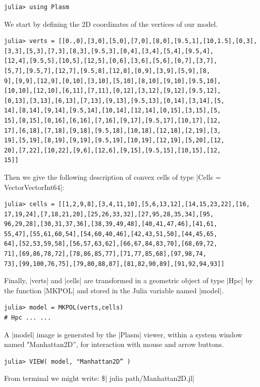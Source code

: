 \begin{script}
\begin{coding}
\begin{lstlisting}[language=JuliaLocal, style=julia, mathescape = true] 
julia> using Plasm
\end{lstlisting} 

We start by defining the 2D coordinates of the vertices of our model. 
\begin{lstlisting}[language=JuliaLocal, style=julia, mathescape = true] 
julia> verts = [[0.,0],[3,0],[5,0],[7,0],[8,0],[9.5,1],[10,1.5],[0,3],
[3,3],[5,3],[7,3],[8,3],[9.5,3],[0,4],[3,4],[5,4],[9.5,4],
[12,4],[9.5,5],[10,5],[12,5],[0,6],[3,6],[5,6],[0,7],[3,7],
[5,7],[9.5,7],[12,7],[9.5,8],[12,8],[0,9],[3,9],[5,9],[8,
9],[9,9],[12,9],[0,10],[3,10],[5,10],[8,10],[9,10],[9.5,10],
[10,10],[12,10],[6,11],[7,11],[0,12],[3,12],[9,12],[9.5,12],
[0,13],[3,13],[6,13],[7,13],[9,13],[9.5,13],[0,14],[3,14],[5,
14],[8,14],[9,14],[9.5,14],[10,14],[12,14],[0,15],[3,15],[5,
15],[8,15],[0,16],[6,16],[7,16],[9,17],[9.5,17],[10,17],[12,
17],[6,18],[7,18],[9,18],[9.5,18],[10,18],[12,18],[2,19],[3,
19],[5,19],[8,19],[9,19],[9.5,19],[10,19],[12,19],[5,20],[12,
20],[7,22],[10,22],[9,6],[12,6],[9,15],[9.5,15],[10,15],[12,
15]]
\end{lstlisting}
Then we give the following description of convex cells of type |Cells = Vector{Vector{Int64}}|:
\begin{lstlisting}[language=JuliaLocal, style=julia, mathescape = true] 
julia> cells = [[1,2,9,8],[3,4,11,10],[5,6,13,12],[14,15,23,22],[16,
17,19,24],[7,18,21,20],[25,26,33,32],[27,95,28,35,34],[95,
96,29,28],[30,31,37,36],[38,39,49,48],[40,41,47,46],[41,61,
55,47],[55,61,60,54],[54,60,40,46],[42,43,51,50],[44,45,65,
64],[52,53,59,58],[56,57,63,62],[66,67,84,83,70],[68,69,72,
71],[69,86,78,72],[78,86,85,77],[71,77,85,68],[97,98,74,
73],[99,100,76,75],[79,80,88,87],[81,82,90,89],[91,92,94,93]]
\end{lstlisting}
Finally, |verts|  and |cells| are transformed in a geometric object of type |Hpc| 
by the function |MKPOL| and stored in the Julia variable named |model|.

\begin{lstlisting}[language=JuliaLocal, style=julia, mathescape = true] 
julia> model = MKPOL(verts,cells)
# Hpc ... ...
\end{lstlisting}
A |model| image is generated by the |Plasm| viewer, within a system window named "Manhattan2D”, for interaction with mouse and arrow buttons. 
\begin{lstlisting}[language=JuliaLocal, style=julia, mathescape = true] 
julia> VIEW( model, "Manhattan2D” )
\end{lstlisting}
From terminal we might write: \$| julia path/Manhattan2D.jl|
\end{coding}




\end{script}
